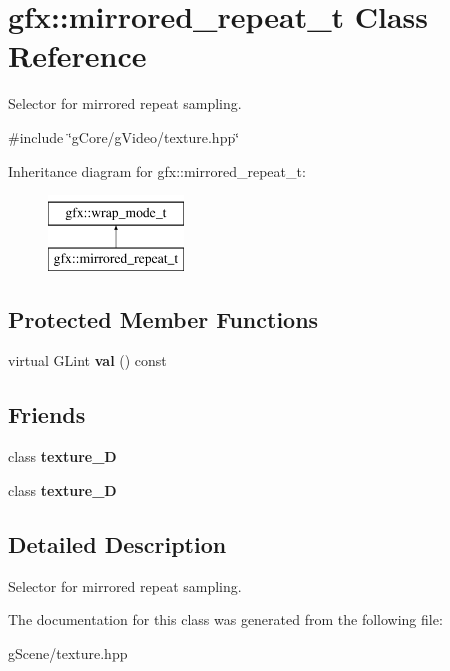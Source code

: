 \hypertarget{classgfx_1_1mirrored__repeat__t}{\section{gfx\-:\-:mirrored\-\_\-repeat\-\_\-t Class Reference}
\label{classgfx_1_1mirrored__repeat__t}
}


Selector for mirrored repeat sampling.  




{\ttfamily \#include \char`\"{}g\-Core/g\-Video/texture.\-hpp\char`\"{}}

Inheritance diagram for gfx\-:\-:mirrored\-\_\-repeat\-\_\-t\-:\begin{figure}[H]
\begin{center}
\leavevmode
\includegraphics[height=2.000000cm]{classgfx_1_1mirrored__repeat__t}
\end{center}
\end{figure}
\subsection*{Protected Member Functions}
\begin{DoxyCompactItemize}
\item 
\hypertarget{classgfx_1_1mirrored__repeat__t_aa0f1593025076337359fbb9385f4d52b}{virtual G\-Lint {\bfseries val} () const }\label{classgfx_1_1mirrored__repeat__t_aa0f1593025076337359fbb9385f4d52b}

\end{DoxyCompactItemize}
\subsection*{Friends}
\begin{DoxyCompactItemize}
\item 
\hypertarget{classgfx_1_1mirrored__repeat__t_a2039d67f6166ccf823c78e3476aad9aa}{class {\bfseries texture\-\_\-D}}\label{classgfx_1_1mirrored__repeat__t_a2039d67f6166ccf823c78e3476aad9aa}

\item 
\hypertarget{classgfx_1_1mirrored__repeat__t_a22ad86ef46c3b17357a0cd59e50bc7dd}{class {\bfseries texture\-\_\-D}}\label{classgfx_1_1mirrored__repeat__t_a22ad86ef46c3b17357a0cd59e50bc7dd}

\end{DoxyCompactItemize}


\subsection{Detailed Description}
Selector for mirrored repeat sampling. 

The documentation for this class was generated from the following file\-:\begin{DoxyCompactItemize}
\item 
g\-Scene/texture.\-hpp\end{DoxyCompactItemize}
